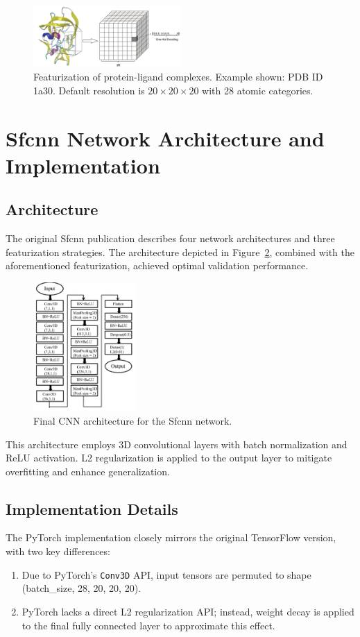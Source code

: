 \documentclass[unnumsec,webpdf,contemporary,large]{oup-authoring-template}
\theoremstyle{thmstyleone}%
\theoremstyle{thmstyletwo}%
\theoremstyle{thmstylethree}%
\begin{document}
\begin{figure}[H]
    \centering
    \includegraphics[width=0.5\textwidth]{images/one_hot.png}
    \caption{Featurization of protein-ligand complexes. Example shown: PDB ID 1a30. Default resolution is $20\times20\times20$ with 28 atomic categories.}
    \label{fig:onehot}
\end{figure}

\section{Sfcnn Network Architecture and Implementation}

\subsection{Architecture}
The original Sfcnn publication describes four network architectures and three featurization strategies. The architecture depicted in Figure~\ref{fig:CNN}, combined with the aforementioned featurization, achieved optimal validation performance.

\begin{figure}[H]
    \centering
    \includegraphics[width=0.35\textwidth]{images/CNN.png}
    \caption{Final CNN architecture for the Sfcnn network.}
    \label{fig:CNN}
\end{figure}

This architecture employs 3D convolutional layers with batch normalization and ReLU activation. L2 regularization is applied to the output layer to mitigate overfitting and enhance generalization.

\subsection{Implementation Details}
The PyTorch implementation closely mirrors the original TensorFlow version, with two key differences:
\begin{enumerate}
    \item Due to PyTorch's \texttt{Conv3D} API, input tensors are permuted to shape (batch\_size, 28, 20, 20, 20).
    \item PyTorch lacks a direct L2 regularization API; instead, weight decay is applied to the final fully connected layer to approximate this effect.
\end{enumerate}
\end{document}
